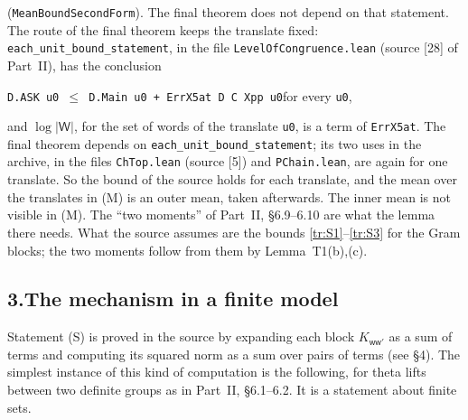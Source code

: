 \documentclass[11pt,letterpaper]{article}
\begin{document}
(\texttt{MeanBoundSecondForm}). The final theorem does not depend on that statement. The route of the final
theorem keeps the translate fixed: \texttt{each\_unit\_bound\_statement}, in the file
\texttt{LevelOfCongruence.lean} (source [28] of Part~II), has the conclusion
\begin{center}\texttt{D.ASK u0 $\le$ D.Main u0 + ErrX5at D C Xpp u0}\quad for every \texttt{u0},\end{center}
and $\log|\mathsf W|$, for the set of words of the translate \texttt{u0}, is a term of \texttt{ErrX5at}. The
final theorem depends on \texttt{each\_unit\_bound\_statement}; its two uses in the archive, in the files
\texttt{ChTop.lean} (source [5]) and \texttt{PChain.lean}, are again for one translate. So the bound of the source holds for each
translate, and the mean over the translates in (M) is an outer mean, taken afterwards.
The inner mean is not visible in (M). The ``two moments'' of Part~II, \S6.9--6.10 are what the lemma there needs.
What the source assumes are the bounds \eqref{tr:S1}--\eqref{tr:S3} for the Gram blocks; the two moments
follow from them by Lemma~T1(b),(c).

\subsection*{3.\quad The mechanism in a finite model}

Statement (S) is proved in the source by expanding each block $K_{\mathsf w\mathsf w'}$ as a sum of terms and
computing its squared norm as a sum over pairs of terms (see \S4). The simplest instance of this kind of
computation is the following, for theta lifts between two definite groups as in Part~II, \S6.1--6.2. It is
a statement about finite sets.
\end{document}
